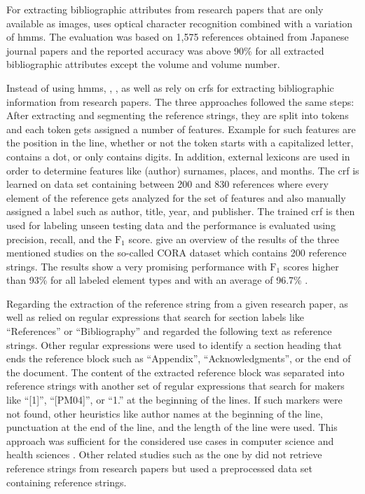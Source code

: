 For extracting bibliographic attributes from research papers that are only available as images, \citet{takasu2003bibliographic} uses optical character recognition combined with a variation of \glspl{hmm}.
The evaluation was based on 1,575 references obtained from Japanese journal papers and the reported accuracy was above 90\% for all extracted bibliographic attributes except the volume and volume number.

Instead of using \glspl{hmm}, \citet{peng2004accurate}, \citet{councill2008parscit}, as well as \citet{groza2012reference} rely on \glspl{crf} for extracting bibliographic information from research papers.
The three approaches followed the same steps:
After extracting and segmenting the reference strings, they are split into tokens and each token gets assigned a number of features.
Example for such features are the position in the line, whether or not the token starts with a capitalized letter, contains a dot, or only contains digits.
In addition, external lexicons are used in order to determine features like (author) surnames, places, and months.
The \gls{crf} is learned on data set containing between 200 and 830 references where every element of the reference gets analyzed for the set of features and also manually assigned a label such as author, title, year, and publisher.
The trained \gls{crf} is then used for labeling unseen testing data and the performance is evaluated using precision, recall, and the $\text{F}_1$ score.
\citet{groza2012reference} give an overview of the results of the three mentioned studies on the so-called CORA dataset which contains 200 reference strings.
The results show a very promising performance with $\text{F}_1$ scores higher than 93\% for all labeled element types and with an average of 96.7\% \citep{groza2012reference}.

Regarding the extraction of the reference string from a given research paper, \citet{councill2008parscit} as well as \citet{groza2012reference} relied on regular expressions that search for section labels like ``References'' or ``Bibliography'' and regarded the following text as reference strings.
Other regular expressions were used to identify a section heading that ends the reference  block such as ``Appendix'', ``Acknowledgments'', or the end of the document.
The content of the extracted reference block was separated into reference strings with another set of regular expressions that search for makers like ``[1]'', ``[PM04]'', or ``1.'' at the beginning of the lines.
If such markers were not found, other heuristics like author names at the beginning of the line, punctuation at the end of the line, and the length of the line were used.
This approach was sufficient for the considered use cases in computer science and health sciences \citep{councill2008parscit,groza2012reference}.
Other related studies such as the one by \citet{peng2004accurate} did not retrieve reference strings from research papers but used a preprocessed data set containing reference strings.

